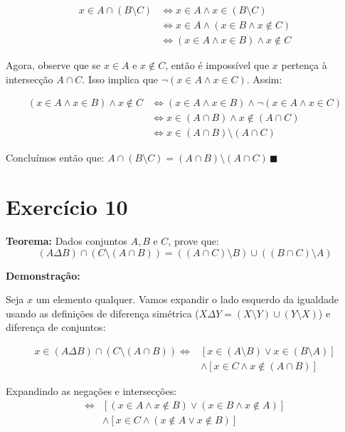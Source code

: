 \documentclass[11pt,reqno,a4paper]{amsart}
\begin{document}
\begin{align*}
x \in A \cap (B \setminus C) &\iff x \in A \land x \in (B \setminus C) \tag{Def. de $\cap$} \\
&\iff x \in A \land (x \in B \land x \notin C) \tag{Def. de $\setminus$} \\
&\iff (x \in A \land x \in B) \land x \notin C \tag{Associatividade da lógica $\land$}
\end{align*}

Agora, observe que se $x \in A$ e $x \notin C$, então é impossível que $x$ pertença à intersecção $A \cap C$. Isso implica que $\neg(x \in A \land x \in C)$. Assim:

\begin{align*}
(x \in A \land x \in B) \land x \notin C &\iff (x \in A \land x \in B) \land \neg(x \in A \land x \in C) \\
&\iff x \in (A \cap B) \land x \notin (A \cap C) \tag{Def. de $\cap$} \\
&\iff x \in (A \cap B) \setminus (A \cap C) \tag{Def. de $\setminus$}
\end{align*}

Concluímos então que: $A \cap (B \setminus C) = (A \cap B) \setminus (A \cap C)\,\blacksquare$

\newpage
\section*{Exercício 10}

\textbf{Teorema:} Dados conjuntos $A, B$ e $C$, prove que:
\[ (A \Delta B) \cap (C \setminus (A \cap B)) = ((A \cap C) \setminus B) \cup ((B \cap C) \setminus A) \]

\textbf{Demonstração:}

Seja $x$ um elemento qualquer. Vamos expandir o lado esquerdo da igualdade usando as definições de diferença simétrica ($X \Delta Y = (X \setminus Y) \cup (Y \setminus X)$) e diferença de conjuntos:

\begin{align*}
x \in (A \Delta B) \cap (C \setminus (A \cap B)) \iff & [x \in (A \setminus B) \lor x \in (B \setminus A)] \\
& \land [x \in C \land x \notin (A \cap B)]
\end{align*}

Expandindo as negações e intersecções:
\begin{align*}
\iff & [(x \in A \land x \notin B) \lor (x \in B \land x \notin A)] \\
& \land [x \in C \land (x \notin A \lor x \notin B)] \tag{Lei de De Morgan}
\end{align*}
\end{document}
